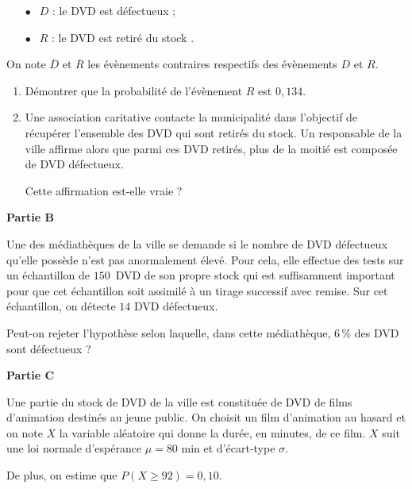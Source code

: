 \documentclass[10pt,a4paper]{article}
\begin{document}
\setlength\parindent{9mm}
\begin{itemize}
\item[$\bullet~~$] $D$ : \og le DVD est défectueux \fg{} ;
\item[$\bullet~~$] $R$ : \og le DVD est retiré du stock \fg.
\end{itemize}
\setlength\parindent{0mm}

On note $\overline{D}$ et $\overline{R}$ les évènements contraires respectifs des évènements $D$ et $R$.

\medskip

\begin{enumerate}
\item Démontrer que la probabilité de l'évènement $R$ est $0,134$.
\item Une association caritative contacte la municipalité dans l'objectif de récupérer l'ensemble des DVD qui sont retirés du stock. Un responsable de la ville affirme alors que parmi ces DVD retirés, plus de la moitié est composée de DVD défectueux.

Cette affirmation est-elle vraie ?
\end{enumerate}

\bigskip

\textbf{Partie B}

\medskip

Une des médiathèques de la ville se demande si le nombre de DVD défectueux qu'elle possède
n'est pas anormalement élevé. Pour cela, elle effectue des tests sur un échantillon de $150 $~DVD de son propre stock qui est suffisamment important pour que cet échantillon soit assimilé à un tirage successif avec remise. Sur cet échantillon, on détecte $14$ DVD défectueux.

Peut-on rejeter l'hypothèse selon laquelle, dans cette médiathèque, 6\,\% des DVD sont défectueux ?

\bigskip

\textbf{Partie C}

\medskip

Une partie du stock de DVD de la ville est constituée de DVD de films d'animation destinés au jeune public. On choisit un film d'animation au hasard et on note $X$ la variable aléatoire qui donne la durée, en minutes, de ce film. $X$ suit une loi normale d'espérance $\mu = 80$ min et d'écart-type $\sigma$.

De plus, on estime que $P(X \geqslant 92) = 0,10$.
\end{document}
